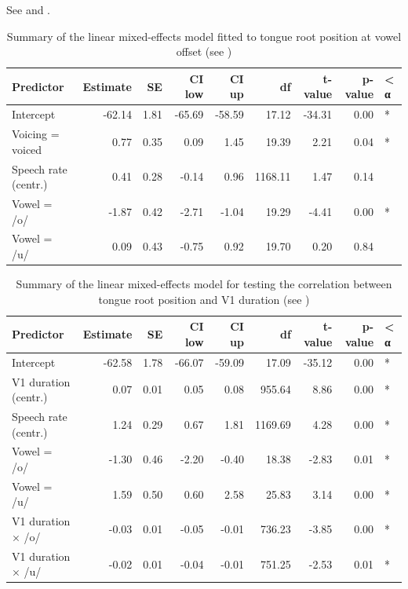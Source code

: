 \documentclass[12pt,]{article}
\begin{document}
See  and .

\begin{table}[t]

\caption{\label{tab:tra-lm-table}Summary of the linear mixed-effects model fitted to tongue root position at vowel offset (see )}
\centering
\fontsize{10}{12}\selectfont
\begin{tabular}{lrrrrrrrl}
\toprule
Predictor & Estimate & SE & CI low & CI up & df & t-value & p-value & < α\\
\midrule
Intercept & -62.14 & 1.81 & -65.69 & -58.59 & 17.12 & -34.31 & 0.00 & *\\
Voicing = voiced & 0.77 & 0.35 & 0.09 & 1.45 & 19.39 & 2.21 & 0.04 & *\\
Speech rate (centr.) & 0.41 & 0.28 & -0.14 & 0.96 & 1168.11 & 1.47 & 0.14 & \\
Vowel = /o/ & -1.87 & 0.42 & -2.71 & -1.04 & 19.29 & -4.41 & 0.00 & *\\
Vowel = /u/ & 0.09 & 0.43 & -0.75 & 0.92 & 19.70 & 0.20 & 0.84 & \\
\bottomrule
\end{tabular}
\end{table}

\begin{table}[t]

\caption{\label{tab:tra-lm-2-table}Summary of the linear mixed-effects model for testing the correlation between tongue root position and V1 duration  (see )}
\centering
\fontsize{10}{12}\selectfont
\begin{tabular}{lrrrrrrrl}
\toprule
Predictor & Estimate & SE & CI low & CI up & df & t-value & p-value & < α\\
\midrule
Intercept & -62.58 & 1.78 & -66.07 & -59.09 & 17.09 & -35.12 & 0.00 & *\\
V1 duration (centr.) & 0.07 & 0.01 & 0.05 & 0.08 & 955.64 & 8.86 & 0.00 & *\\
Speech rate (centr.) & 1.24 & 0.29 & 0.67 & 1.81 & 1169.69 & 4.28 & 0.00 & *\\
Vowel = /o/ & -1.30 & 0.46 & -2.20 & -0.40 & 18.38 & -2.83 & 0.01 & *\\
Vowel = /u/ & 1.59 & 0.50 & 0.60 & 2.58 & 25.83 & 3.14 & 0.00 & *\\
V1 duration × /o/ & -0.03 & 0.01 & -0.05 & -0.01 & 736.23 & -3.85 & 0.00 & *\\
V1 duration × /u/ & -0.02 & 0.01 & -0.04 & -0.01 & 751.25 & -2.53 & 0.01 & *\\
\bottomrule
\end{tabular}
\end{table}


\end{document}
